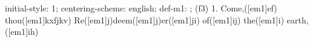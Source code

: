 initial-style: 1;
centering-scheme: english;
def-m1: \grealign;
(f3) 1. Come,([em1]ef) thou([em1]kxfjkv) Re([em1]j)deem([em1]j)er([em1]ji) of([em1]ij) the([em1]i) earth,([em1]ih)